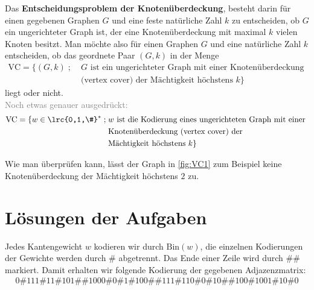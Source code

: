 \begin{mydefinition}\label{mydefinition:entscheidungVC}
Das \textbf{Entscheidungsproblem der Knotenüberdeckung}, besteht darin für einen gegebenen Graphen $G$ und eine feste natürliche Zahl $k$ zu entscheiden, ob $G$ ein ungerichteter Graph ist, der eine Knotenüberdeckung mit maximal $k$ vielen Knoten besitzt. Man möchte also für einen Graphen $G$ und eine natürliche Zahl $k$ entscheiden, ob das geordnete Paar $(G,k)$ in der Menge
\begin{equation*}
	\begin{split}
		\text{VC} =\{ (G,k) \; ; \; & \text{$G$ ist ein ungerichteter Graph mit einer Knotenüberdeckung } \\
		                            & \text{(vertex cover) der Mächtigkeit höchstens $k$} \}
	\end{split}
\end{equation*}
liegt oder nicht.\\
\textcolor{Gray}{Noch etwas genauer ausgedrückt:
	\begin{equation*}
		\begin{split}
			\text{VC} =\{ w\in\lrc{0,1,\#}^* \; ; \; & \text{$w$ ist die Kodierung eines ungerichteten Graph mit einer } \\
			                                         & \text{Knotenüberdeckung (vertex cover) der }                      \\
			                                         & \text{Mächtigkeit höchstens $k$} \}
		\end{split}
	\end{equation*}}
\end{mydefinition}
Wie man überprüfen kann, lässt der Graph in \cref{fig:VC1} zum Beispiel keine Knotenüberdeckung der Mächtigkeit höchstens $2$ zu.


\clearpage
\section{Lösungen der Aufgaben}


\begin{myanswer}[myexercise:0300]
	Jedes Kantengewicht $w$ kodieren wir durch $\text{Bin}(w)$, die einzelnen Kodierungen der Gewichte werden durch $\#$ abgetrennt. Das Ende einer Zeile wird durch $\#\#$ markiert. Damit erhalten wir folgende Kodierung der gegebenen Adjazenzmatrix:
	\begin{align*}
		0 \# 111 \# 11 \# 101 \#\# 1000 \# 0 \# 1 \# 100 \#\# 111 \# 110 \# 0 \# 10 \#\# 100 \# 1001 \# 10 \# 0
	\end{align*}
\end{myanswer}

